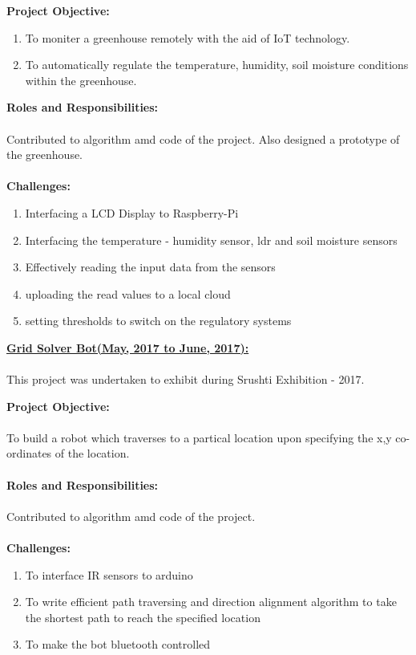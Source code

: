 \documentclass[letterpaper,11pt,oneside]{article}
\begin{document}
\begin{enumerate}
    	\textbf{\large Project Objective:}
    	\begin{enumerate}
    		\item To moniter a greenhouse remotely with the aid of IoT technology.
    		\item To automatically regulate the temperature, humidity, soil moisture conditions within the greenhouse.\\
    	\end{enumerate}
    	\textbf{\large Roles and Responsibilities:}\\
    	\\
    	Contributed to algorithm amd code of the project. Also designed a prototype of the greenhouse.\\
    	\\
    	\textbf{\large Challenges:}
    	\begin{enumerate}
    		\item Interfacing a LCD Display to Raspberry-Pi
    		\item Interfacing the temperature - humidity sensor, ldr and soil moisture sensors
    		\item Effectively reading the input data from the sensors
    		\item uploading the read values to a local cloud 
    		\item setting thresholds to switch on the regulatory systems
    	\end{enumerate}
    	
    	\vspace{2ex}
    	
    	\textbf{\underline{\Large Grid Solver Bot(May, 2017 to June, 2017):}}\\
    	\\
    	This project was undertaken to exhibit during Srushti Exhibition - 2017.
    	
    	\vspace{2ex}
    	
    	\textbf{\large Project Objective:}\\
    	\\
    	To build a robot which traverses to a partical location upon specifying the x,y co-ordinates of the location.\\
    	\\
    	\textbf{\large Roles and Responsibilities:}\\
    	\\
    	Contributed to algorithm amd code of the project.\\
    	\\
    	\textbf{\large Challenges:}
    	\begin{enumerate}
    		\item To interface IR sensors to arduino
    		\item To write efficient path traversing and direction alignment algorithm to take the shortest path to reach the specified location 
    		\item To make the bot bluetooth controlled
    	\end{enumerate}
    	\end{enumerate}
    
\end{document}
